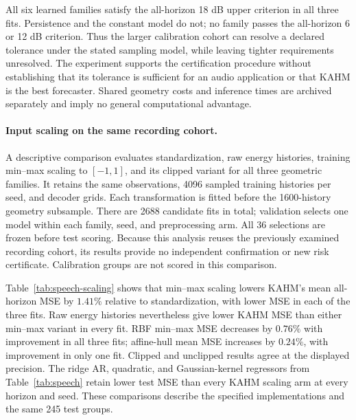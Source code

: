 All six learned families satisfy the all-horizon 18 dB upper criterion in
all three fits. Persistence and the constant model do not; no family passes
the all-horizon 6 or 12 dB criterion. Thus the larger calibration cohort can
resolve a declared tolerance under the stated sampling model, while leaving
tighter requirements unresolved. The experiment supports the certification
procedure without establishing that its tolerance is sufficient for an audio
application or that KAHM is the best forecaster. Shared geometry costs and inference times
are archived separately and imply no general computational advantage.

\paragraph{Input scaling on the same recording cohort.}
A descriptive comparison evaluates standardization, raw energy histories,
training min--max scaling to $[-1,1]$, and its clipped variant for all three
geometric families. It retains the same observations, 4096 sampled training
histories per seed, and decoder grids. Each transformation is fitted before
the 1600-history geometry subsample. There are 2688 candidate fits in total;
validation selects one model within each family, seed, and preprocessing arm.
All 36 selections are frozen before test scoring. Because this analysis
reuses the previously examined recording cohort, its results provide no
independent confirmation or new risk certificate. Calibration groups are
not scored in this comparison.



Table~\ref{tab:speech-scaling} shows that min--max scaling lowers KAHM's mean
all-horizon MSE by $1.41\%$ relative to standardization, with lower MSE in
each of the three fits. Raw energy histories nevertheless give lower KAHM
MSE than either min--max variant in every fit. RBF min--max MSE decreases by
$0.76\%$ with improvement in all three fits; affine-hull mean MSE increases
by $0.24\%$, with improvement in only one fit. Clipped and unclipped results
agree at the displayed precision. The ridge AR, quadratic, and
Gaussian-kernel regressors from Table~\ref{tab:speech} retain lower test MSE
than every KAHM scaling arm at every horizon and seed. These comparisons
describe the specified implementations and the same 245 test groups.
